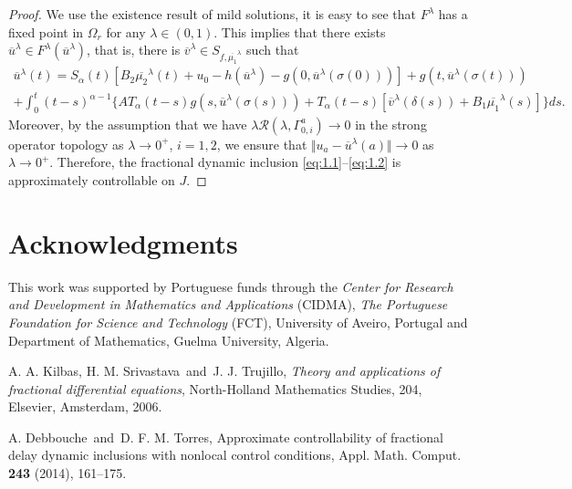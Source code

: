 \documentclass[a4paper,11pt,twoside]{article}
\begin{document}
\begin{proof}
We use the existence result of mild solutions, it is easy to see that $F^{\lambda}$ has a fixed point in $\Omega_{r}$
for any $\lambda\in (0, 1)$. This implies that there exists
$\overline{u}^{\lambda}\in F^{\lambda}(\overline{u}^{\lambda})$, that is, there is
$\overline{v}^{\lambda}\in S_{f,\overline{\mu_{1}}^{\lambda}}$ such that
\begin{multline*}
\overline{u}^{\lambda}(t)=S_{\alpha}(t)\left[
B_{2}\overline{\mu_{2}}^{\lambda}(t)+u_{0}-h\left(\overline{u}^{\lambda}\right)
-g\left(0, \overline{u}^{\lambda}(\sigma(0))\right)\right]
+g\left(t, \overline{u}^{\lambda}(\sigma(t))\right)\\
+\int_{0}^{t}(t-s)^{\alpha-1}\biggl\lbrace AT_{\alpha}(t-s)
g\left(s, \overline{u}^{\lambda}(\sigma(s))\right)
+T_{\alpha}(t-s)\left[\overline{v}^{\lambda}(\delta(s))
+B_{1}\overline{\mu_{1}}^{\lambda}(s)\right]\biggr\rbrace ds.
\end{multline*}
Moreover, by the assumption that we have $\lambda\mathcal{R}(\lambda, \Gamma^{a}_{0,i})\rightarrow 0$
in the strong operator topology as $\lambda\rightarrow 0^{+}$, $i=1,2$,
we ensure that
$\Vert u_{a}-\overline{u}^{\lambda}(a)\Vert\rightarrow 0$
as $\lambda\rightarrow 0^{+}$. Therefore, the fractional dynamic inclusion
\eqref{eq:1.1}--\eqref{eq:1.2} is approximately controllable on $J$.
\end{proof}


\section*{Acknowledgments}

This work was supported by Portuguese funds through the
\emph{Center for Research and Development in Mathematics and Applications} (CIDMA), 
\emph{The Portuguese Foundation for Science and Technology} (FCT), University of Aveiro, 
Portugal and Department of Mathematics, Guelma University, Algeria.


\begin{thebibliography}{9}

A. A. Kilbas, H. M. Srivastava\ and\ J. J. Trujillo, 
{\it Theory and applications of fractional differential equations}, 
North-Holland Mathematics Studies, 204, Elsevier, Amsterdam, 2006. 

A. Debbouche\ and\ D. F. M. Torres, 
Approximate controllability of fractional delay dynamic inclusions 
with nonlocal control conditions, 
Appl. Math. Comput. {\bf 243} (2014), 161--175. 

\end{thebibliography}

\end{document}

